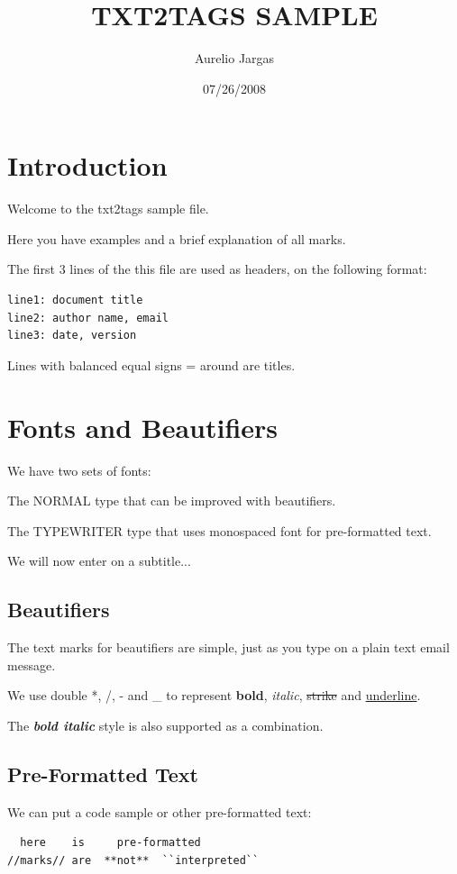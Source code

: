 \documentclass{article}
\title{TXT2TAGS SAMPLE}
\author{Aurelio Jargas}
\begin{document}
\date{07/26/2008}
\maketitle
\clearpage


\section*{Introduction}
Welcome to the txt2tags sample file.

Here you have examples and a brief explanation of all
marks.

The first 3 lines of the this file are used as headers,
on the following format:

\begin{verbatim}
line1: document title
line2: author name, email
line3: date, version
\end{verbatim}

Lines with balanced equal signs = around are titles.


\section*{Fonts and Beautifiers}
We have two sets of fonts:

The NORMAL type that can be improved with beautifiers.

The TYPEWRITER type that uses monospaced font for
pre-formatted text.

We will now enter on a subtitle...

\subsection*{Beautifiers}
The text marks for beautifiers are simple, just as you
type on a plain text email message.

We use double *, /, - and \_ to represent \textbf{bold},
\textit{italic}, \sout{strike} and \underline{underline}.

The \textbf{\textit{bold italic}} style is also supported as a
combination.

\subsection*{Pre-Formatted Text}
We can put a code sample or other pre-formatted text:

\begin{verbatim}
  here    is     pre-formatted
//marks// are  **not**  ``interpreted``
\end{verbatim}
\end{document}
